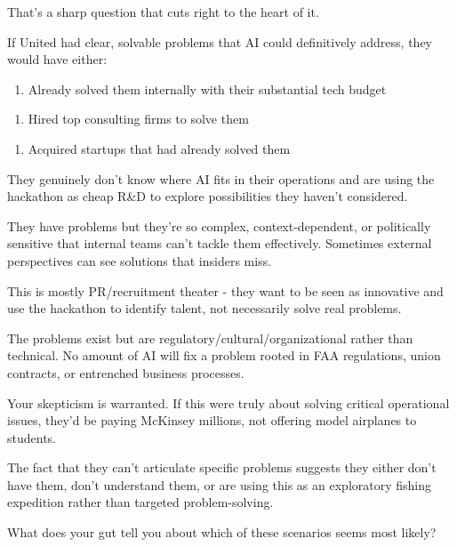That's a sharp question that cuts right to the heart of it.

 If United had clear, solvable problems that AI could definitively address, they would have either:

\begin{enumerate}
\item Already solved them internally with their substantial tech budget
\end{enumerate}
\begin{enumerate}
\item Hired top consulting firms to solve them
\end{enumerate}
\begin{enumerate}
\item Acquired startups that had already solved them
\end{enumerate}


 They genuinely don't know where AI fits in their operations and are using the hackathon as cheap R&D to explore possibilities they haven't considered.

 They have problems but they're so complex, context-dependent, or politically sensitive that internal teams can't tackle them effectively. Sometimes external perspectives can see solutions that insiders miss.

 This is mostly PR/recruitment theater - they want to be seen as innovative and use the hackathon to identify talent, not necessarily solve real problems.

 The problems exist but are regulatory/cultural/organizational rather than technical. No amount of AI will fix a problem rooted in FAA regulations, union contracts, or entrenched business processes.

Your skepticism is warranted. If this were truly about solving critical operational issues, they'd be paying McKinsey millions, not offering model airplanes to students.

The fact that they can't articulate specific problems suggests they either don't have them, don't understand them, or are using this as an exploratory fishing expedition rather than targeted problem-solving.

What does your gut tell you about which of these scenarios seems most likely?


